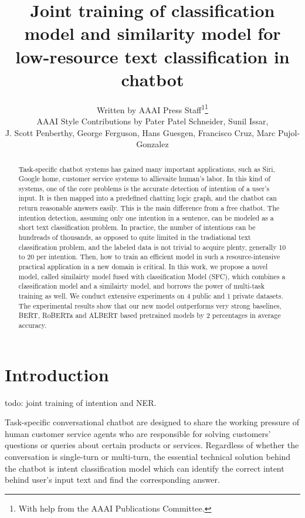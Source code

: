 \documentclass[letterpaper]{article} %
\title{     
  Joint training of classification model and similarity model for low-resource
  text classification in chatbot
}
\author{
  Written by AAAI Press Staff\textsuperscript{\rm 1}\thanks{With help from the AAAI Publications Committee.}\\
  AAAI Style Contributions by Pater Patel Schneider,
  Sunil Issar,  \\
  J. Scott Penberthy,
  George Ferguson,
  Hans Guesgen,
  Francisco Cruz,
  Marc Pujol-Gonzalez
  \\
}
\begin{document}
  \maketitle

  \begin{abstract}
    Task-specific  chatbot  systems has gained many important applications, such
    as  Siri, Google home, customer service systems to allievaite human's labor.
    In  this  kind  of  systems, one of the core problems is the accurate detection of
    intention  of  a  user's input. It is then mapped into a predefined chatting
    logic  graph,  and the chatbot can return reasonable answers easily. This is
    the  main  difference from a free chatbot. The intention detection, assuming
    only  one  intention  in  a  sentence,  can  be  modeled  as  a  short  text
    classification  problem.  In  practice,  the  number  of  intentions  can be
    hundreads of thousands, as opposed to quite limited in the tradiational text
    classification  problem,  and  the  labeled  data  is not trivial to acquire
    plenty,  generally  10  to 20 per intention. Then, how to train an efficient
    model  in such a resource-intensive practical application in a new domain is
    critical.  In  this  work, we propose a novel model, called similairty model
    fused with classification Model (SFC), which combines a classification model
    and  a  similairty  model,  and  borrows the power of multi-task training as
    well.  We  conduct extensive experiments on 4 public and 1 private datasets.
    The  experimental  results  show  that our new model outperforms very strong
    baselines, BERT, RoBERTa and ALBERT based pretrained models by 2 percentages
    in average accuracy.

  \end{abstract}

  \section{Introduction}
  \label{sec:intro}


  todo: joint training of intention and NER.

  Task-specific  conversational  chatbot  \cite{wen2016network}  are  designed  to
  share   the  working  pressure  of  human  customer  service  agents  who  are
  responsible for solving customers' questions or queries about certain products
  or  services.  Regardless  of  whether  the  conversation  is  single-turn  or
  multi-turn,  the  essential  technical  solution  behind the chatbot is intent
  classification model which can identify the correct intent behind user's input
  text and find the corresponding answer.
\end{document}
